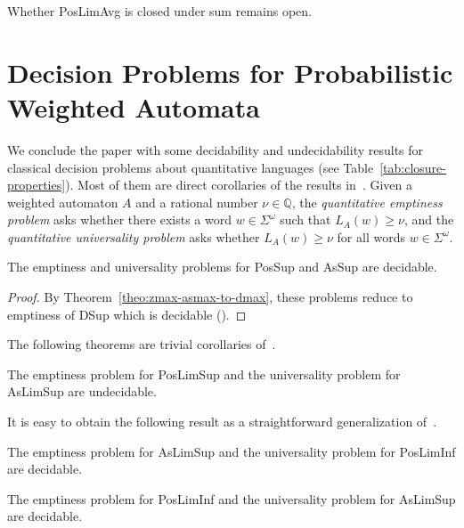 \documentclass{llncs}
\newcommand{\rat}{{\mathbb Q}}
\newcommand{\dmax}{{\sc DSup}}
\newcommand{\zmax}{{\sc PosSup}}
\newcommand{\zla}{{\sc PosLimAvg}}
\newcommand{\zli}{{\sc PosLimInf}}
\newcommand{\zls}{{\sc PosLimSup}}
\newcommand{\asmax}{{\sc AsSup}}
\newcommand{\asls}{{\sc AsLimSup}}
\begin{document}
 Whether \zla\/ is closed under sum remains open.



\section{Decision Problems for Probabilistic Weighted Automata}

We conclude the paper with some decidability and undecidability results for classical decision problems
about quantitative languages (see Table~\ref{tab:closure-properties}). 
Most of them are direct corollaries of the results in~\cite{BG08}.
Given a weighted automaton $A$ and a rational number $\nu \in \rat$, 
the \emph{quantitative emptiness problem} asks whether there exists a word $w \in \Sigma^{\omega}$
such that $L_{A}(w) \geq \nu$, and the \emph{quantitative universality problem}
asks whether $L_{A}(w) \geq \nu$ for all words $w \in \Sigma^{\omega}$.





\begin{theorem}
The emptiness and universality problems for \zmax\/ and \asmax\/ are decidable.
\end{theorem}

\begin{proof}
By Theorem~\ref{theo:zmax-asmax-to-dmax}, these problems reduce to emptiness
of \dmax\/ which is decidable (\cite[Theorem~1]{CDH08a}).
\end{proof}



The following theorems are trivial corollaries of~\cite[Theorem~2]{BG08}.

\begin{theorem}
The emptiness problem for \zls\/ and the universality problem for \asls\/ are undecidable.
\end{theorem}

It is easy to obtain the following result as a straightforward generalization
of~\cite[Theorem~6]{BG08}.

\begin{theorem}
The emptiness problem for \asls\/ and the universality problem for \zli\/ are decidable.
\end{theorem}



\begin{theorem}
The emptiness problem for \zli\/ and the universality problem for \asls\/ are decidable.
\end{theorem}
\end{document}
